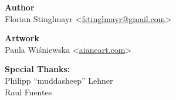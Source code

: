 \onecolumn


\vspace*{\fill}

\begin{center}
  \textbf{Author}\\
  Florian Stinglmayr
  <\href{mailto:fstinglmayr@gmail.com}{fstinglmayr@gmail.com}>

  \textbf{Artwork}\\
  Paula Wiśniewska
  <\href{http://aianeart.com}{aianeart.com}>

  \textbf{Special Thanks:}\\
  Philipp ``muddasheep'' Lehner\\
  Raul Fuentes
\end{center}

\twocolumn
\newpage
